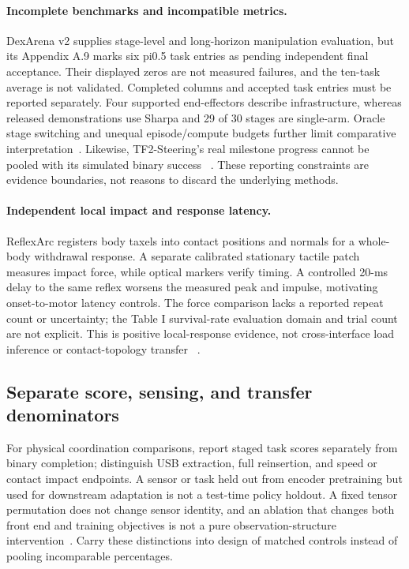 \paragraph{Incomplete benchmarks and incompatible metrics.}
DexArena v2 supplies stage-level and long-horizon manipulation evaluation, but
its Appendix A.9 marks six pi0.5 task entries as pending independent final
acceptance. Their displayed zeros are not measured failures, and the ten-task
average is not validated. Completed columns and accepted task entries must be
reported separately. Four supported end-effectors describe infrastructure,
whereas released demonstrations use Sharpa and 29 of 30 stages are single-arm.
Oracle stage switching and unequal episode/compute budgets further limit
comparative interpretation~\cite{nov2026dexarena}. Likewise, TF2-Steering's real
milestone progress cannot be pooled with its simulated binary success
~\cite{nov2026tf2steering}. These reporting constraints are evidence boundaries,
not reasons to discard the underlying methods.

\paragraph{Independent local impact and response latency.}
ReflexArc registers body taxels into contact positions and normals for a
whole-body withdrawal response. A separate calibrated stationary tactile patch
measures impact force, while optical markers verify timing. A controlled
20-ms delay to the same reflex worsens the measured peak and impulse, motivating
onset-to-motor latency controls. The force comparison lacks a reported repeat
count or uncertainty; the Table I survival-rate evaluation domain and trial
count are not explicit. This is positive local-response evidence, not
cross-interface load inference or contact-topology transfer
~\cite{nov2026reflexarc}.

\subsection{Separate score, sensing, and transfer denominators}

For physical coordination comparisons, report staged task scores separately
from binary completion; distinguish USB extraction, full reinsertion, and
speed or contact impact endpoints. A sensor or task held out from encoder
pretraining but used for downstream adaptation is not a test-time policy
holdout. A fixed tensor permutation does not change sensor identity, and an
ablation that changes both front end and training objectives is not a pure
observation-structure intervention~\cite{nov18lingbottouch,nov18witac,
nov18whichtaxels,nov18physicaltactilecues}. Carry these distinctions into design
of matched controls instead of pooling incomparable percentages.
